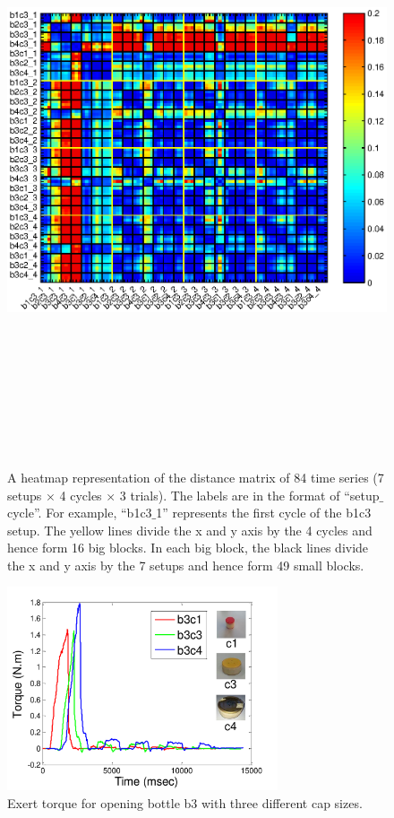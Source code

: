 \begin{figure}
\label{heatmap}
  \centering
  \includegraphics[width=18cm,height=18cm]{./fig/heatmap_all6_3.eps}
  \caption{ \scriptsize{A heatmap representation of the distance matrix of 84 time series (7 setups $\times$ 4 cycles $\times$ 3 trials). The labels are in the format of ``setup$\_$cycle''. For example, ``b1c3$\_$1'' represents the first cycle of the b1c3 setup. The yellow lines divide the x and y axis by the 4 cycles and hence form 16 big blocks. In each big block, the black lines divide the x and y axis by the 7 setups and hence form 49 small blocks. }
}
\label{fig:heatmap}
\end{figure}

\begin{figure}
    \centering
    \includegraphics[width=8cm]{./fig/c1c3c4_time_T.pdf}
    \caption{ \scriptsize{Exert torque for opening bottle b3 with three different cap sizes.}
}
\label{fig:cappatterns}
\end{figure}


